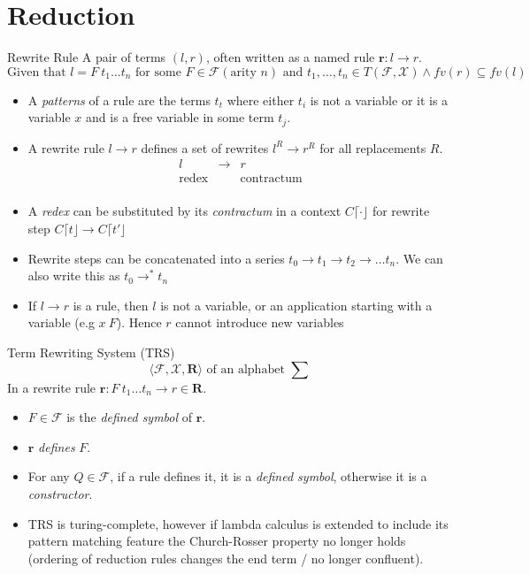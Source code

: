 \section{Reduction}
\begin{definitionbox}{Rewrite Rule}
    A pair of terms $(l, r)$, often written as a named rule $\mathbf{r} : l \to r$.
    \[\text{Given that }l = F \ t_1 \dots t_n \text{ for some }F \in \mathcal{F} (\text{arity }n) \text{ and } t_1, \dots , t_n \in T(\mathcal{F}, \mathcal{X}) \land fv(r) \subseteq fv(l)\]
    \begin{itemize}
        \item A \textit{patterns} of a rule are the terms $t_t$ where either $t_i$ is not a variable or it is a variable $x$ and is a free variable in some term $t_j$.
        \item {A rewrite rule $l \to r$ defines a set of rewrites $l^R \to r^R$ for all replacements $R$. 
        \[\begin{matrix}
            l & \to & r \\
            \text{redex} & & \text{contractum} \\
        \end{matrix}\]}
        \item A \textit{redex} can be substituted by its \textit{contractum} in a context $C\lceil \cdot \rfloor$ for rewrite step $C\lceil t \rfloor \to C \lceil t' \rfloor$
        \item Rewrite steps can be concatenated into a series $t_0 \to t_1 \to t_2 \to \dots t_n$. We can also write this as $t_0 \to^* t_n$
        \item If $l \to r$ is a rule, then $l$ is not a variable, or an application starting with a variable (e.g $x \ F$). Hence $r$ cannot introduce new variables
    \end{itemize}
\end{definitionbox}

\begin{definitionbox}{Term Rewriting System (TRS)}
    \[\langle \mathcal{F}, \mathcal{X}, \mathbf{R} \rangle \text{ of an alphabet } \sum\]
    In a rewrite rule $\mathbf{r} : F \ t_1 \dots t_n \to r \in \mathbf{R}$.
    \begin{itemize}
        \item $F \in \mathcal{F}$ is the \textit{defined symbol} of $\mathbf{r}$.
        \item $\mathbf{r}$ \textit{defines} $F$.
        \item For any $Q \in \mathcal{F}$, if a rule defines it, it is a \textit{defined symbol}, otherwise it is a \textit{constructor}.
        \item TRS is turing-complete, however if lambda calculus is extended to include its pattern matching feature the Church-Rosser property no longer holds (ordering of reduction rules changes the end term / no longer confluent).
    \end{itemize}
\end{definitionbox}

